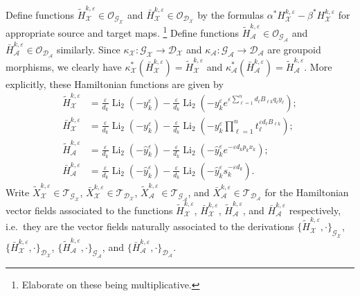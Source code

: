 \documentclass{amsart}
\numberwithin{equation}{section}
\newcommand{\cA}{\mathcal{A}}
\newcommand{\cG}{\mathcal{G}}
\newcommand{\cD}{\mathcal{D}}
\newcommand{\cO}{\mathcal{O}}
\newcommand{\cX}{\mathcal{X}}
\newcommand{\cT}{\mathcal{T}}
\newcommand{\Li}{\operatorname{Li}}
\begin{document}
Define functions $\tilde H_\cX^{k,\varepsilon}\in\cO_{\cG_\cX}$ and $\bar H_\cX^{k,\varepsilon}\in\cO_{\cD_\cX}$ by the formulas $\alpha^* H_\cX^{k,\varepsilon}-\beta^* H_\cX^{k,\varepsilon}$ for appropriate source and target maps. \footnote{Elaborate on these being multiplicative.}
Define functions $\tilde H_\cA^{k,\varepsilon}\in\cO_{\cG_\cA}$ and $\bar H_\cA^{k,\varepsilon}\in\cO_{\cD_\cA}$ similarly.
Since $\kappa_\cX:\cG_\cX\to\cD_\cX$ and $\kappa_\cA:\cG_\cA\to\cD_\cA$ are groupoid morphisms, we clearly have $\kappa_\cX^*(\bar H_\cX^{k,\varepsilon})=\tilde H_\cX^{k,\varepsilon}$ and $\kappa_\cA^*(\bar H_\cA^{k,\varepsilon})=\tilde H_\cA^{k,\varepsilon}$.
More explicitly, these Hamiltonian functions are given by
\begin{align*}
  \tilde H_\cX^{k,\varepsilon}&=\frac{\varepsilon}{d_k}\Li_2(-y_k^\varepsilon)-\frac{\varepsilon}{d_k}\Li_2\left(-y_k^\varepsilon e^{\varepsilon\sum_{\ell=1}^n d_\ell B_{\ell k}q_\ell y_\ell}\right);\\
  \bar H_\cX^{k,\varepsilon}&=\frac{\varepsilon}{d_k}\Li_2(-y_k^\varepsilon)-\frac{\varepsilon}{d_k}\Li_2\left(-y_k^\varepsilon\prod_{\ell=1}^n t_\ell^{\varepsilon d_\ell B_{\ell k}}\right);\\
  \tilde H_\cA^{k,\varepsilon}&=\frac{\varepsilon}{d_k}\Li_2(-\hat y_k^\varepsilon)-\frac{\varepsilon}{d_k}\Li_2\left(-\hat y_k^\varepsilon e^{-\varepsilon d_kp_kx_k}\right);\\
  \bar H_\cA^{k,\varepsilon}&=\frac{\varepsilon}{d_k}\Li_2(-\hat y_k^\varepsilon)-\frac{\varepsilon}{d_k}\Li_2\left(-\hat y_k^\varepsilon s_k^{-\varepsilon d_k}\right).
\end{align*}
Write $\tilde X_\cX^{k,\varepsilon}\in\cT_{\cG_\cX}$, $\bar X_\cX^{k,\varepsilon}\in\cT_{\cD_\cX}$, $\tilde X_\cA^{k,\varepsilon}\in\cT_{\cG_\cA}$, and $\bar X_\cA^{k,\varepsilon}\in\cT_{\cD_\cA}$ for the Hamiltonian vector fields associated to the functions $\tilde H_\cX^{k,\varepsilon}$, $\bar H_\cX^{k,\varepsilon}$, $\tilde H_\cA^{k,\varepsilon}$, and $\bar H_\cA^{k,\varepsilon}$ respectively, i.e.\ they are the vector fields naturally associated to the derivations $\{\tilde H_\cX^{k,\varepsilon},\cdot\}_{\cG_\cX}$, $\{\bar H_\cX^{k,\varepsilon},\cdot\}_{\cD_\cX}$, $\{\tilde H_\cA^{k,\varepsilon},\cdot\}_{\cG_\cA}$, and $\{\bar H_\cA^{k,\varepsilon},\cdot\}_{\cD_\cA}$.
\end{document}
